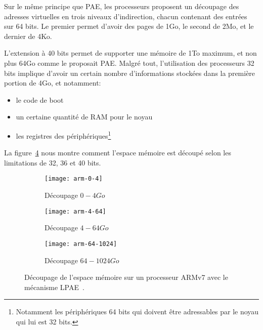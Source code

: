     Sur le même principe que PAE, les processeurs proposent un découpage des
    adresses virtuelles en trois niveaux d'indirection, chacun contenant des
    entrées sur 64 bits. Le premier permet d'avoir des pages de 1Go, le second
    de 2Mo, et le dernier de 4Ko.

    L'extension à 40 bits permet de supporter une mémoire de 1To maximum, et non
    plus 64Go comme le proposait PAE. Malgré tout, l'utilisation des processeurs
    32 bits implique d'avoir un certain nombre d'informations stockées dans la
    première portion de 4Go, et notamment:

    \begin{itemize}
      \item le code de boot
      \item un certaine quantité de RAM
        pour le noyau
      \item les registres des périphériques\footnote{Notamment les périphériques
        64 bits qui doivent être adressables par le noyau qui lui est 32 bits.}
    \end{itemize}

    La figure~\ref{fig:arm-0-1024} nous montre comment l'espace mémoire est
    découpé selon les limitations de 32, 36 et 40 bits.

    \begin{figure}[ht]
      \begin{subfigure}[b]{0.37\textwidth}
        \texttt{[image: arm-0-4]}
        \caption{Découpage $0-4Go$}
        \label{fig:arm-0-4}
      \end{subfigure}
      \begin{subfigure}[b]{0.37\textwidth}
        \texttt{[image: arm-4-64]}
        \caption{Découpage $4-64Go$}
        \label{fig:arm-4-64}
      \end{subfigure}
      \begin{subfigure}[b]{0.23\textwidth}
        \texttt{[image: arm-64-1024]}
        \caption{Découpage $64-1024Go$}
        \label{fig:arm-64-1024}
      \end{subfigure}
      \caption{Découpage de l'espace mémoire sur un processeur ARMv7 avec le
        mécanisme LPAE~\citep{arm2012principles}.}
      \label{fig:arm-0-1024}
    \end{figure}

